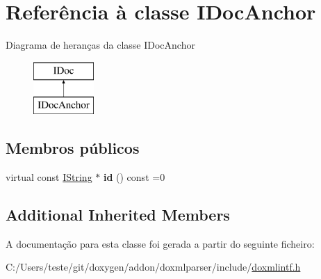 \hypertarget{class_i_doc_anchor}{\section{Referência à classe I\-Doc\-Anchor}
\label{class_i_doc_anchor}
}
Diagrama de heranças da classe I\-Doc\-Anchor\begin{figure}[H]
\begin{center}
\leavevmode
\includegraphics[height=2.000000cm]{class_i_doc_anchor}
\end{center}
\end{figure}
\subsection*{Membros públicos}
\begin{DoxyCompactItemize}
\item 
\hypertarget{class_i_doc_anchor_aaba28daa272dce8bc14dde330d5b0126}{virtual const \hyperlink{class_i_string}{I\-String} $\ast$ {\bfseries id} () const =0}\label{class_i_doc_anchor_aaba28daa272dce8bc14dde330d5b0126}

\end{DoxyCompactItemize}
\subsection*{Additional Inherited Members}


A documentação para esta classe foi gerada a partir do seguinte ficheiro\-:\begin{DoxyCompactItemize}
\item 
C\-:/\-Users/teste/git/doxygen/addon/doxmlparser/include/\hyperlink{include_2doxmlintf_8h}{doxmlintf.\-h}\end{DoxyCompactItemize}
